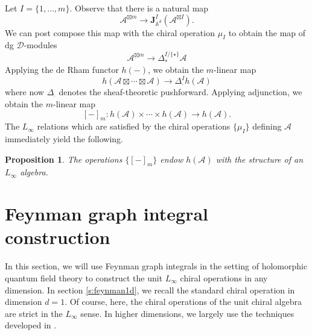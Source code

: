 \documentclass[11pt]{amsart}
\newtheorem{prop}[thm]{Proposition}
\theoremstyle{definition}
\theoremstyle{remark}
\numberwithin{equation}{section}
\begin{document}
Let $I = \{1,\ldots,m\}$.
Observe that there is a natural map
\begin{equation}\label{}
  \mathcal{A}^{\boxtimes m} \to \mathbf{J}^I_{\mathbb{A}^d} (\mathcal{A}^{\boxtimes I}).
\end{equation}
We can post compose this map with the chiral operation $\mu_I$ to obtain the map of dg $\mathcal{D}$-modules
\begin{equation}\label{}
  \mathcal{A}^{\boxtimes m} \to \Delta_*^{I \slash \{\star\}} \mathcal{A}
\end{equation}
Applying the de Rham functor $h(-)$, we obtain the $m$-linear map
\begin{equation}\label{}
  h(\mathcal{A} \boxtimes \cdots \boxtimes \mathcal{A}) \to \Delta_{\cdot}^I h(\mathcal{A})
\end{equation}
where now $\Delta_\cdot$ denotes the sheaf-theoretic pushforward.
Applying adjunction, we obtain the $m$-linear map
$$
[-]_m \colon h(\mathcal{A}) \times \cdots \times h(\mathcal{A})\rightarrow h(\mathcal{A}).
$$
The $L_\infty$ relations which are satisfied by the chiral operations $\{\mu_I\}$ defining $\mathcal{A}$ immediately
yield the following.

\begin{prop}\label{prop:derham}
  The operations $\{[-]_m\}$ endow $h(\mathcal{A})$ with the structure of an $L_\infty$ algebra.
\end{prop}

\section{Feynman graph integral construction}\label{s:feynman}

In this section, we will use Feynman graph integrals in the setting of holomorphic quantum field theory to construct the unit
$L_{\infty}$ chiral operations in any dimension.
In section \ref{s:feynman1d}, we recall the standard chiral operation in dimension $d=1$.
Of course, here, the chiral operations of the unit chiral algebra are strict in the $L_\infty$ sense.
In higher dimensions, we largely use the techniques developed in \cite{wang2024feynman}.
\end{document}
